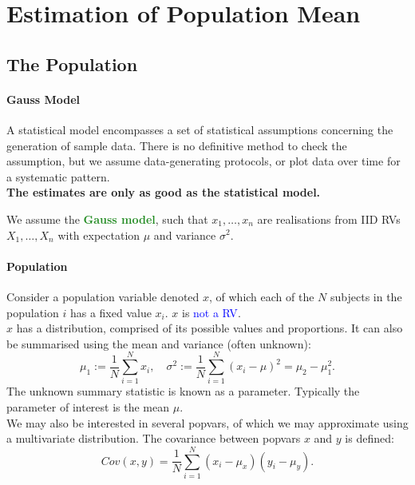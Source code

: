 \section{Estimation of Population Mean}

\subsection{The Population}
\paragraph{Gauss Model}
A statistical model encompasses a set of statistical assumptions concerning the
generation of sample data. There is no definitive method to check the
assumption, but we assume data-generating protocols, or plot data over time for
a systematic pattern.\\
\textbf{The estimates are only as good as the statistical model.}

We assume the \textbf{\textcolor{ForestGreen}{Gauss model}}, such that
$x_1,\ldots,x_{n}$ are realisations from IID RVs
$X_1,\ldots,X_{n}$ with expectation $\mu$ and variance $\sigma^{2}$.

\paragraph{Population}
Consider a \textcolor{Bittersweet}{population variable} denoted $x$, of which
each of the $N$ subjects in the population $i$ has a fixed value $x_i$. 
$x$ is \textcolor{Blue}{not a RV}.\\
$x$ has a distribution, comprised of its possible values and proportions. It can also be
summarised using the \textcolor{Bittersweet}{mean and variance} (often unknown):
\[\mu_1:=\frac{1}{N}\sum_{i=1}^{N} x_i,\quad\sigma^{2}:=\frac{1}{N}\sum_{i=1}^{N} {\left( x_i-\mu \right) }^{2}=\mu_2-\mu_1^{2}.\]
The unknown summary statistic is known as a \textcolor{Bittersweet}{parameter}.
Typically the parameter of interest is the mean $\mu$.\\
We may also be interested in several popvars, of which we may approximate
using a \textcolor{Bittersweet}{multivariate distribution}. The
\textcolor{Bittersweet}{covariance} between popvars $x$ and $y$ is defined:
\[Cov(x,y)=\frac{1}{N}\sum_{i=1}^{N} \left( x_i-\mu_x \right) \left( y_i-\mu_y \right).\] 

